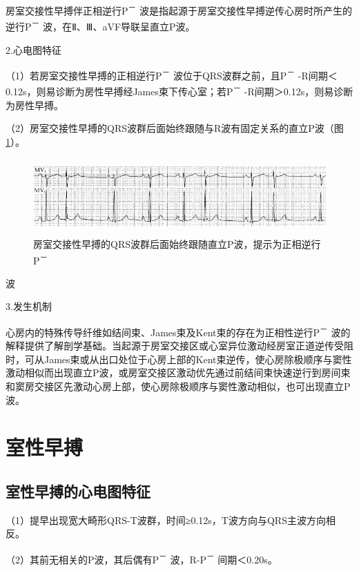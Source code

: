 房室交接性早搏伴正相逆行P\textsuperscript{－}
波是指起源于房室交接性早搏逆传心房时所产生的逆行P\textsuperscript{－}
波，在Ⅱ、Ⅲ、aVF导联呈直立P波。

2.心电图特征

（1）若房室交接性早搏的正相逆行P\textsuperscript{－}
波位于QRS波群之前，且P\textsuperscript{－}
-R间期＜0.12s，则易诊断为房性早搏经James束下传心室；若P\textsuperscript{－}
-R间期＞0.12s，则易诊断为房性早搏。

（2）房室交接性早搏的QRS波群后面始终跟随与R波有固定关系的直立P波（图\ref{fig11-18}）。

\begin{figure}[!htbp]
 \centering
 \includegraphics[width=5.58333in,height=1.14583in]{./images/Image00178.jpg}
 \captionsetup{justification=centering}
 \caption{房室交接性早搏的QRS波群后面始终跟随直立P波，提示为正相逆行P\textsuperscript{－}}
 \label{fig11-18}
  \end{figure} 
波

3.发生机制

心房内的特殊传导纤维如结间束、James束及Kent束的存在为正相性逆行P\textsuperscript{－}
波的解释提供了解剖学基础。当起源于房室交接区或心室异位激动经房室正道逆传受阻时，可从James束或从出口处位于心房上部的Kent束逆传，使心房除极顺序与窦性激动相似而出现直立P波，或房室交接区激动优先通过前结间束快速逆行到房间束和窦房交接区先激动心房上部，使心房除极顺序与窦性激动相似，也可出现直立P波。

\protect\hypertarget{text00018.htmlux5cux23subid150}{}{}

\section{室性早搏}

\protect\hypertarget{text00018.htmlux5cux23subid151}{}{}

\subsection{室性早搏的心电图特征}

（1）提早出现宽大畸形QRS-T波群，时间≥0.12s，T波方向与QRS主波方向相反。

（2）其前无相关的P波，其后偶有P\textsuperscript{－}
波，R-P\textsuperscript{－} 间期＜0.20s。

